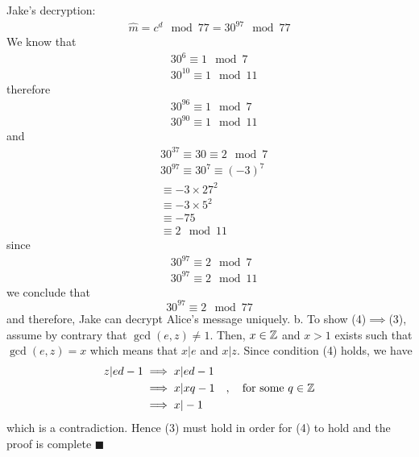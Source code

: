 \documentclass[10pt,letterpaper]{article}
\begin{document}
Jake's decryption:
\begin{equation}\begin{split}
\hat m=c^d\mod 77=30^{97}\mod 77
\end{split}\end{equation}
We know that
\begin{equation}\begin{split}
&30^{6}\equiv 1\mod 7
\\&
30^{10}\equiv 1\mod 11
\end{split}\end{equation}
therefore
\begin{equation}\begin{split}
&30^{96}\equiv 1\mod 7
\\&
30^{90}\equiv 1\mod 11
\end{split}\end{equation}
and
\begin{equation}\begin{split}
&30^{37}\equiv 30\equiv2\mod 7
\\&
30^{97}\equiv 30^7\equiv (-3)^7
\\&
\equiv -3\times 27^2
\\&
\equiv -3\times 5^2
\\&
\equiv -75
\\&
\equiv 2\mod 11
\end{split}\end{equation}
since
\begin{equation}\begin{split}
&30^{97}\equiv 2\mod 7
\\&30^{97}\equiv 2\mod 11
\end{split}\end{equation}
we conclude that
$$
30^{97}\equiv 2\mod 77
$$
and therefore, Jake can decrypt Alice's message uniquely.
\newline\newline
b. To show (4)$\implies$(3), assume by contrary that $\gcd(e,z)\ne 1$. Then, $x\in \Bbb Z$ and $x>1$ exists such that $\gcd(e,z)=x$ which means that $x|e$ and $x|z$. Since condition (4) holds, we have
\begin{equation}\begin{split}
z|ed-1&\implies x|ed-1
\\&
\implies x|xq-1\quad,\quad\text{for some }q\in\Bbb Z
\\&
\implies x|-1
\end{split}\end{equation}
which is a contradiction. Hence (3) must hold in order for (4) to hold and the proof is complete $\blacksquare$
\end{document}
